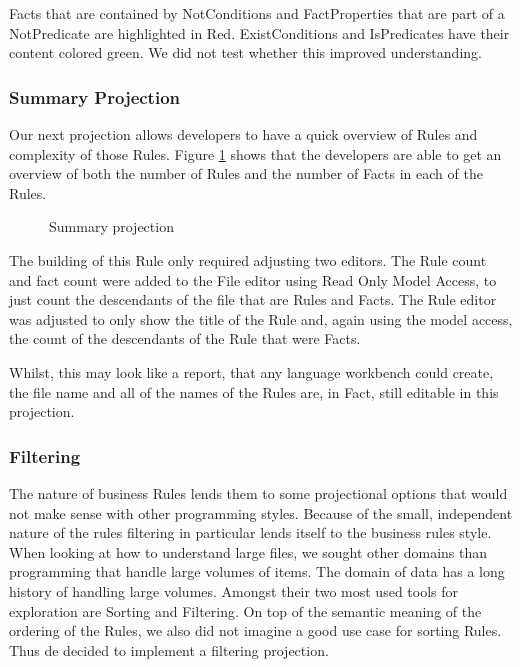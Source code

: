 Facts that are contained by NotConditions and FactProperties that are part of a NotPredicate are highlighted in Red.
ExistConditions and IsPredicates have their content colored green.
We did not test whether this improved understanding.

\subsubsection{Summary Projection}
Our next projection allows developers to have a quick overview of Rules and complexity of those Rules.
Figure \ref{fig:summaryProjection} shows that the developers are able to get an overview of both the number of Rules and the number of Facts in each of the Rules.

\begin{figure}[h]
    \centering
    \caption{Summary projection}
    \label{fig:summaryProjection}
\end{figure}

The building of this Rule only required adjusting two editors.
The Rule count and fact count were added to the File editor using Read Only Model Access, to just count the descendants of the file that are Rules and Facts.
The Rule editor was adjusted to only show the title of the Rule and, again using the model access, the count of the descendants of the Rule that were Facts.

Whilst, this may look like a report, that any language workbench could create, the file name and all of the names of the Rules are, in Fact, still editable in this projection.

\subsubsection{Filtering}
The nature of business Rules lends them to some projectional options that would not make sense with other programming styles.
Because of the small, independent nature of the rules filtering in particular lends itself to the business rules style.
When looking at how to understand large files, we sought other domains than programming that handle large volumes of items.
The domain of data has a long history of handling large volumes.
Amongst their two most used tools for exploration are Sorting and Filtering.
On top of the semantic meaning of the ordering of the Rules, we also did not imagine a good use case for sorting Rules.
Thus de decided to implement a filtering projection.

